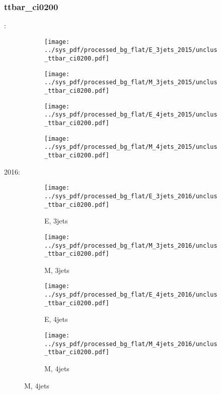 \documentclass{beamer}
\begin{document}
\begin{frame}
\frametitle{ttbar_ci0200}
\fontsize{5}{1}:
\begin{figure}
\centering
\begin{subfigure}[b]{0.24\textwidth}
\texttt{[image: ../sys\_pdf/processed\_bg\_flat/E\_3jets\_2015/unclus\_ttbar\_ci0200.pdf]}
\end{subfigure}
\begin{subfigure}[b]{0.24\textwidth}
\texttt{[image: ../sys\_pdf/processed\_bg\_flat/M\_3jets\_2015/unclus\_ttbar\_ci0200.pdf]}
\end{subfigure}
\begin{subfigure}[b]{0.24\textwidth}
\texttt{[image: ../sys\_pdf/processed\_bg\_flat/E\_4jets\_2015/unclus\_ttbar\_ci0200.pdf]}
\end{subfigure}
\begin{subfigure}[b]{0.24\textwidth}
\texttt{[image: ../sys\_pdf/processed\_bg\_flat/M\_4jets\_2015/unclus\_ttbar\_ci0200.pdf]}
\end{subfigure}
\end{figure}
2016:
\begin{figure}
\centering
\begin{subfigure}[b]{0.24\textwidth}
\texttt{[image: ../sys\_pdf/processed\_bg\_flat/E\_3jets\_2016/unclus\_ttbar\_ci0200.pdf]}
\captionsetup{font=tiny}
\caption{E, 3jets}
\end{subfigure}
\begin{subfigure}[b]{0.24\textwidth}
\texttt{[image: ../sys\_pdf/processed\_bg\_flat/M\_3jets\_2016/unclus\_ttbar\_ci0200.pdf]}
\captionsetup{font=tiny}
\caption{M, 3jets}
\end{subfigure}
\begin{subfigure}[b]{0.24\textwidth}
\texttt{[image: ../sys\_pdf/processed\_bg\_flat/E\_4jets\_2016/unclus\_ttbar\_ci0200.pdf]}
\captionsetup{font=tiny}
\caption{E, 4jets}
\end{subfigure}
\begin{subfigure}[b]{0.24\textwidth}
\texttt{[image: ../sys\_pdf/processed\_bg\_flat/M\_4jets\_2016/unclus\_ttbar\_ci0200.pdf]}
\captionsetup{font=tiny}
\caption{M, 4jets}
\end{subfigure}
\end{figure}
\end{frame}
\end{document}
